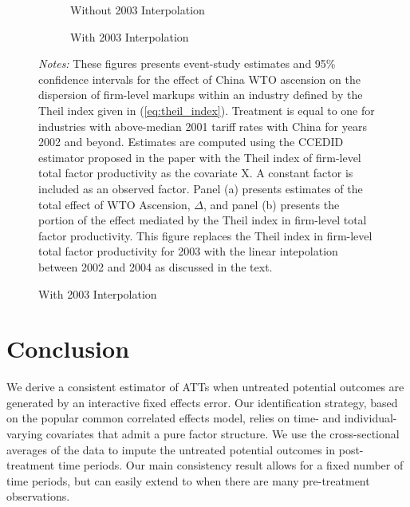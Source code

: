 \documentclass[12pt,fleqn]{article}
\makeatletter
\let\@@input
\makeatother
\begin{document}
\begin{figure}
    \caption{Estimates when Using Observed $X_{it}$}
    \label{fig:trade_observed_x}

    \begin{subfigure}[b]{\textwidth}
        \caption{Without 2003 Interpolation}
        
    \end{subfigure}
    
    \begin{subfigure}[b]{\textwidth}
        \caption{With 2003 Interpolation}
        
    \end{subfigure}
    
    {\footnotesize\emph{Notes:} These figures presents event-study estimates and 95\% confidence intervals for the effect of China WTO ascension on the dispersion of firm-level markups within an industry defined by the Theil index given in (\ref{eq:theil_index}). Treatment is equal to one for industries with above-median 2001 tariff rates with China for years 2002 and beyond. Estimates are computed using the CCEDID estimator proposed in the paper with the Theil index of firm-level total factor productivity as the covariate X. A constant factor is included as an observed factor. Panel (a) presents estimates of the total effect of WTO Ascension, $\Delta$, and panel (b) presents the portion of the effect mediated by the Theil index in firm-level total factor productivity. This figure replaces the Theil index in firm-level total factor productivity for 2003 with the linear intepolation between 2002 and 2004 as discussed in the text.}
\end{figure}





\section{Conclusion}



We derive a consistent estimator of ATTs when untreated potential outcomes are generated by an interactive fixed effects error. Our identification strategy, based on the popular common correlated effects model, relies on time- and individual-varying covariates that admit a pure factor structure. We use the cross-sectional averages of the data to impute the untreated potential outcomes in post-treatment time periods. Our main consistency result allows for a fixed number of time periods, but can easily extend to when there are many pre-treatment observations. 
\end{document}
